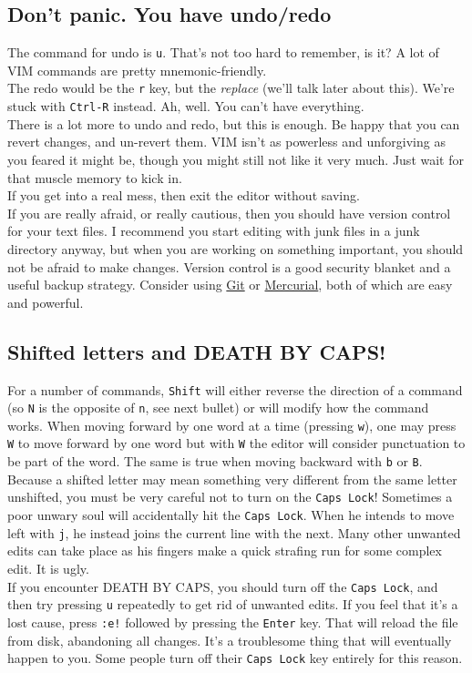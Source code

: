 \documentclass[a4paper, 12pt]{article}
\begin{document}
\subsection{Don't panic. You have undo/redo}
\label{"Don't panic. You have undo/redo"}
The command for undo is \texttt{u}. That's not too hard to remember, is it? A lot of VIM commands are pretty mnemonic-friendly.\\
The redo would be the \texttt{r} key, but the \textit{replace} (we'll talk later about this). We're stuck with \texttt{Ctrl-R} instead. Ah, well. You can't have everything.\\
There is a lot more to undo and redo, but this is enough. Be happy that you can revert changes, and un-revert them. VIM isn't as powerless and unforgiving as you feared it might be, though you might still not like it very much. Just wait for that muscle memory to kick in.\\
If you get into a real mess, then exit the editor without saving.\\
If you are really afraid, or really cautious, then you should have version control for your text files. I recommend you start editing with junk files in a junk directory anyway, but when you are working on something important, you should not be afraid to make changes. Version control is a good security blanket and a useful backup strategy. Consider using \href{http://git-scm.com/}{Git} or \href{http://mercurial.selenic.com/}{Mercurial}, both of which are easy and powerful.
\subsection{Shifted letters and DEATH BY CAPS!}
\label{"Shifted letters and DEATH BY CAPS!"}
For a number of commands, \texttt{Shift} will either reverse the direction of a command (so \texttt{N} is the opposite of \texttt{n}, see next bullet) or will modify how the command works. When moving forward by one word at a time (pressing \texttt{w}), one may press \texttt{W} to move forward by one word but with \texttt{W} the editor will consider punctuation to be part of the word. The same is true when moving backward with \texttt{b} or \texttt{B}.\\
Because a shifted letter may mean something very different from the same letter unshifted, you must be very careful not to turn on the \texttt{Caps Lock}! Sometimes a poor unwary soul will accidentally hit the \texttt{Caps Lock}. When he intends to move left with \texttt{j}, he instead joins the current line with the next. Many other unwanted edits can take place as his fingers make a quick strafing run for some complex edit. It is ugly.\\
If you encounter DEATH BY CAPS, you should turn off the \texttt{Caps Lock}, and then try pressing \texttt{u} repeatedly to get rid of unwanted edits. If you feel that it's a lost cause, press \texttt{:e!} followed by pressing the \texttt{Enter} key. That will reload the file from disk, abandoning all changes. It's a troublesome thing that will eventually happen to you. Some people turn off their \texttt{Caps Lock} key entirely for this reason.
\end{document}
